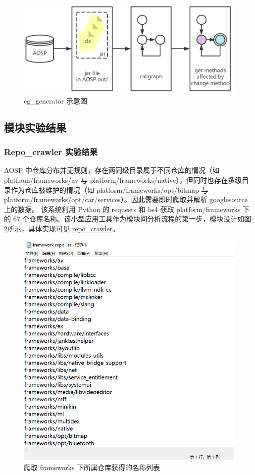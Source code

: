 \begin{figure}[htb]
    \centering
    \includegraphics[width=.9\textwidth]{figures/archi-cg-generator.png}
    \caption{cg\_generator 示意图}
    \label{fig:archi-cg-generator}
\end{figure}

\subsection{模块实验结果}

\subsubsection{Repo\_crawler 实验结果}

AOSP 中仓库分布并无规则，存在两同级目录属于不同仓库的情况（如 platfrom/frameworks/av 与 platform/frameworks/native），但同时也存在多级目录作为仓库被维护的情况（如 platform/frameworks/opt/bitmap 与 platform/frameworks/opt/car/services）。因此需要即时爬取并解析 googlesource 上的数据。 该系统利用 Python 的 requests 和 bs4 获取 platform/frameworks 下的 67 个仓库名称。该小型应用工具作为模块间分析流程的第一步，模块设计如图\ref{fig:design-repo-list}所示，具体实现可见 \href{https://github.com/AOSPworking/repo_crawler}{repo\_crawler}。

\begin{figure}[htb]
    \centering
    \includegraphics[width=.4\textwidth]{figures/design-repo-list.png}
    \caption{爬取 frameworks 下所属仓库获得的名称列表}
    \label{fig:design-repo-list}
\end{figure}

